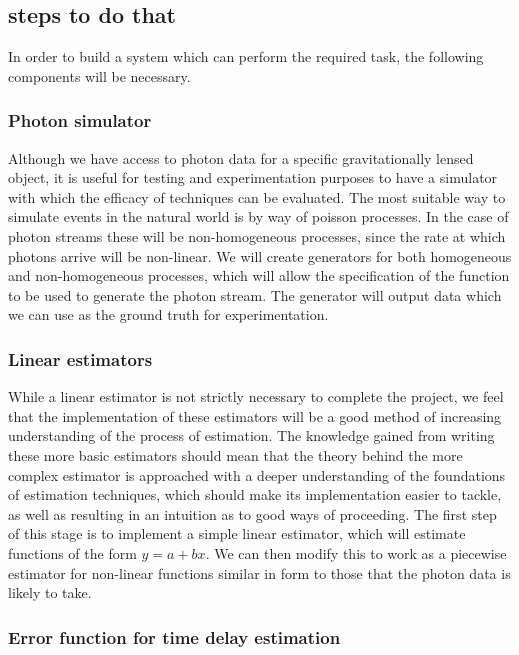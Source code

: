 \documentclass[a4paper,11pt]{article}
\begin{document}
\subsection{steps to do that}
\label{sec-1-4}

   In order to build a system which can perform the required task, the
   following components will be necessary.
   
\subsubsection{Photon simulator}
\label{sec-1-4-1}

    Although we have access to photon data for a specific
    gravitationally lensed object, it is useful for testing and
    experimentation purposes to have a simulator with which the
    efficacy of techniques can be evaluated. The most suitable way to
    simulate events in the natural world is by way of poisson
    processes. In the case of photon streams these will be
    non-homogeneous processes, since the rate at which photons arrive
    will be non-linear. We will create generators for both homogeneous
    and non-homogeneous processes, which will allow the specification
    of the function to be used to generate the photon stream. The
    generator will output data which we can use as the ground truth
    for experimentation.
\subsubsection{Linear estimators}
\label{sec-1-4-2}

    While a linear estimator is not strictly necessary to complete the
    project, we feel that the implementation of these estimators will
    be a good method of increasing understanding of the process of
    estimation. The knowledge gained from writing these more basic
    estimators should mean that the theory behind the more complex
    estimator is approached with a deeper understanding of the
    foundations of estimation techniques, which should make its
    implementation easier to tackle, as well as resulting in an
    intuition as to good ways of proceeding. The first step of this
    stage is to implement a simple linear estimator, which will
    estimate functions of the form $y=a+bx$. We can then modify this
    to work as a piecewise estimator for non-linear functions similar
    in form to those that the photon data is likely to take.
\subsubsection{Error function for time delay estimation}
\label{sec-1-4-3}
\end{document}
